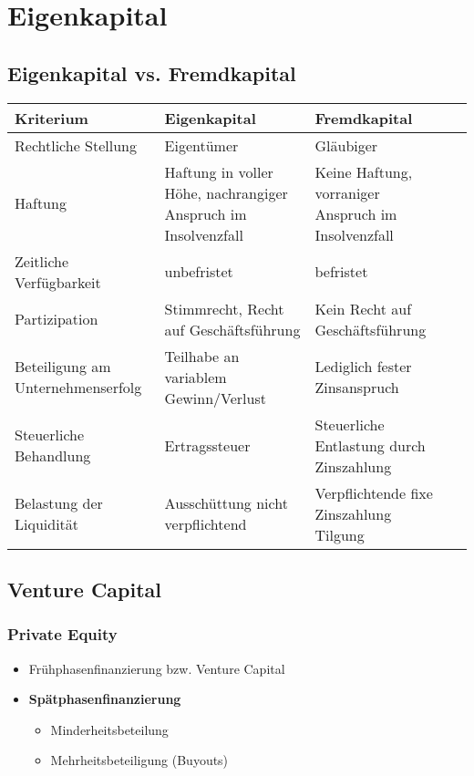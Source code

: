 \section{Eigenkapital}

\subsection{Eigenkapital vs. Fremdkapital}
\begin{tabularx}{\columnwidth}{|X|X|X|l}
	\hline
		\textbf{Kriterium} & \textbf{Eigenkapital} & \textbf{Fremdkapital} \\
	\hline
		Rechtliche Stellung & Eigentümer & Gläubiger \\
		Haftung	& Haftung in voller Höhe, nachrangiger Anspruch im Insolvenzfall & Keine Haftung, vorraniger Anspruch im Insolvenzfall \\
		Zeitliche Verfügbarkeit & unbefristet & befristet \\
		Partizipation & Stimmrecht, Recht auf Geschäftsführung & Kein Recht auf Geschäftsführung \\
		Beteiligung am Unternehmenserfolg & Teilhabe an variablem Gewinn/Verlust & Lediglich fester Zinsanspruch \\
		Steuerliche Behandlung & Ertragssteuer & Steuerliche Entlastung durch Zinszahlung \\
		Belastung der Liquidität & Ausschüttung nicht verpflichtend & Verpflichtende fixe Zinszahlung Tilgung \\
	\hline
\end{tabularx}


\subsection{Venture Capital}

\subsubsection{Private Equity}
\begin{itemize}
	\item Frühphasenfinanzierung bzw. Venture Capital
	\item \textbf{Spätphasenfinanzierung}
	\begin{itemize}
		\item Minderheitsbeteilung
		\item Mehrheitsbeteiligung (Buyouts)
	\end{itemize}
\end{itemize}

